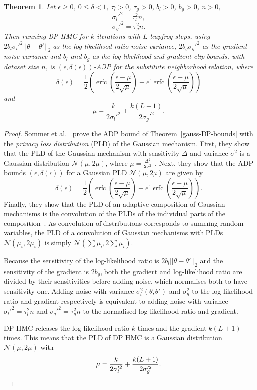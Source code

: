 \documentclass[english,twoside,openright]{HYgraduMLDS}
\newtheorem{theorem}[lemma]{Theorem}
\newcommand{\caln}{{\mathcal{N}}}
\DeclareMathOperator{\erfc}{erfc}
\begin{document}
\begin{theorem}\label{dp_hmc_theorem_adp}
  Let \(\epsilon \geq 0\), \(0 \leq \delta < 1\), \(\tau_{l} > 0\),
  \(\tau_{g} > 0\), \(b_{l} > 0\), \(b_{g} > 0\), \(n > 0\),
  \[
    \sigma_{l}'^{2} = \tau_{l}^{2}n,
  \]
  \[
    \sigma_{g}'^{2} = \tau_{g}^{2}n.
  \]
  Then running DP HMC for \(k\) iterations with \(L\) leapfrog steps,
  using \(2b_{l}\sigma_{l}'^{2}||\theta - \theta'||_{2}\) as the log-likelihood ratio
  noise variance, \(2b_{g}\sigma_{g}'^{2}\) as the gradient noise variance
  and \(b_{l}\) and \(b_{g}\) as the log-likelihood and gradient clip bounds,
  with dataset size \(n\), is \((\epsilon, \delta(\epsilon))\)-ADP for the
  substitute neighborhood relation, where
  \[
    \delta(\epsilon) = \frac{1}{2}\left(
      \erfc\left(\frac{\epsilon - \mu}{2\sqrt{\mu}}\right)
      - e^{\epsilon}\erfc\left(\frac{\epsilon + \mu}{2\sqrt{\mu}}\right)\right)
  \]
  and
  \[
    \mu = \frac{k}{2\sigma_{l}'^{2}} + \frac{k(L + 1)}{2\sigma_{g}'^{2}}.
  \]
\end{theorem}
\begin{proof}
Sommer et al.~\cite{Sommer2019} prove the ADP bound of Theorem~\ref{gauss-DP-bounds} with
the \emph{privacy loss distribution} (PLD) of the Gaussian mechanism. First, they
show that the PLD of the Gaussian mechanism with sensitivity \(\Delta\) and variance
\(\sigma^{2}\) is a Gaussian distribution
\(\caln(\mu, 2\mu)\), where \(\mu = \frac{\Delta^{2}}{2\sigma^{2}}\)~\cite[Lemma 11]{Sommer2019}.
Next, they show that the ADP bounds \((\epsilon, \delta(\epsilon))\) for a
Gaussian PLD \(\caln(\mu, 2\mu)\) are given by~\cite[Lemma 12]{Sommer2019}
\[
  \delta(\epsilon) = \frac{1}{2}\left(
    \erfc\left(\frac{\epsilon - \mu}{2\sqrt{\mu}}\right)
    - e^{\epsilon}\erfc\left(\frac{\epsilon + \mu}{2\sqrt{\mu}}\right)\right).
\]
Finally, they show that the PLD of an adaptive composition of Gaussian mechanisms
is the convolution of
the PLDs of the individual parts of the composition~\cite[Theorem 1]{Sommer2019}.
As convolution of distributions corresponds to summing random variables, the PLD of a
convolution of Gaussian mechanisms with PLDs \(\caln(\mu_{i}, 2\mu_{i})\) is
simply \(\caln(\sum \mu_{i}, 2\sum \mu_{i})\).

Because the sensitivity of the log-likelihood ratio is
\(2b_{l}||\theta - \theta'||_{2}\) and the sensitivity of the gradient is
\(2b_{g}\), both the gradient and log-likelihood ratio are divided by their
sensitivities before adding noise, which normalises both to have sensitivity
one. Adding noise with variance \(\sigma_{l}^2(\theta, \theta')\)
and \(\sigma_{g}^{2}\) to the log-likelihood ratio and gradient respectively
is equivalent to adding noise with variance
\(\sigma_{l}'^{2} = \tau_{l}^{2}n\) and \(\sigma_{g}'^{2} = \tau_{g}^{2}n\)
to the normalised log-likelihood ratio and gradient.

DP HMC releases the log-likelihood ratio \(k\) times and the gradient
\(k(L + 1)\) times. This means that the PLD of DP HMC is a Gaussian distribution
\(\caln(\mu, 2\mu)\) with
\[
  \mu = \frac{k}{2\sigma_{l}'^{2}} + \frac{k(L + 1)}{2\sigma_{g}'^{2}}.
  \qedhere
\]
\end{proof}
\end{document}

